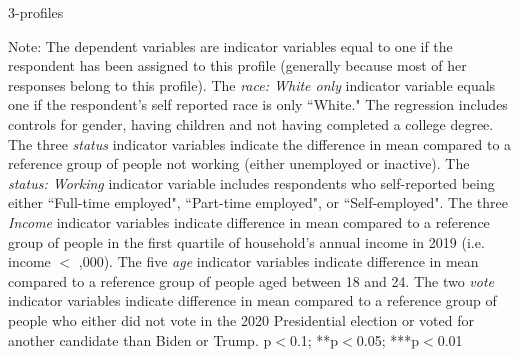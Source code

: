 \documentclass{article}
\begin{document}
\begin{table}[h!]
    \caption{3-profiles}
    \begin{center}
        \scalebox{0.7}{}
    \end{center}
    {\footnotesize Note: The dependent variables are indicator variables equal to one if the respondent has been assigned to this profile (generally because most of her responses belong to this profile). 
    The \textit{race: White only} indicator variable equals one if the respondent's self reported race is only ``White." The regression includes controls for gender, having children and not having completed a college degree. The three \textit{status} indicator variables indicate the difference in mean compared to a reference group of people not working (either unemployed or inactive). The \textit{status: Working} indicator variable includes respondents who self-reported being either ``Full-time employed", ``Part-time employed", or ``Self-employed". The three \textit{Income} indicator variables indicate difference in mean compared to a reference group of people in the first quartile of household's annual income in 2019 (i.e. income $<$ ,000). The five \textit{age} indicator variables indicate difference in mean compared to a reference group of people aged between 18 and 24. The two \textit{vote} indicator variables indicate difference in mean compared to a reference group of people who either did not vote in the 2020 Presidential election or voted for another candidate than Biden or Trump.
    \newline  *p$<$0.1; **p$<$0.05; ***p$<$0.01}
\end{table} 
\end{document}
